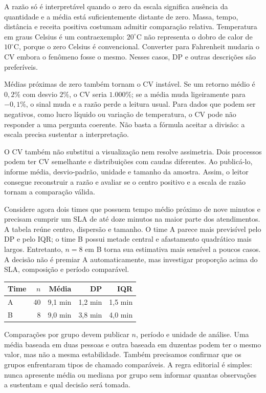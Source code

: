 A razão só é interpretável quando o zero da escala significa ausência da quantidade e a média está suficientemente distante de zero. Massa, tempo, distância e receita positiva costumam admitir comparação relativa. Temperatura em graus Celsius é um contraexemplo: $20^\circ$C não representa o dobro de calor de $10^\circ$C, porque o zero Celsius é convencional. Converter para Fahrenheit mudaria o CV embora o fenômeno fosse o mesmo. Nesses casos, DP e outras descrições são preferíveis.

Médias próximas de zero também tornam o CV instável. Se um retorno médio é $0{,}2\%$ com desvio $2\%$, o CV seria $1.000\%$; se a média muda ligeiramente para $-0{,}1\%$, o sinal muda e a razão perde a leitura usual. Para dados que podem ser negativos, como lucro líquido ou variação de temperatura, o CV pode não responder a uma pergunta coerente. Não basta a fórmula aceitar a divisão: a escala precisa sustentar a interpretação.

O CV também não substitui a visualização nem resolve assimetria. Dois processos podem ter CV semelhante e distribuições com caudas diferentes. Ao publicá-lo, informe média, desvio-padrão, unidade e tamanho da amostra. Assim, o leitor consegue reconstruir a razão e avaliar se o centro positivo e a escala de razão tornam a comparação válida.

Considere agora dois times que possuem tempo médio próximo de nove minutos e precisam cumprir um SLA de até doze minutos na maior parte dos atendimentos. A tabela reúne centro, dispersão e tamanho. O time A parece mais previsível pelo DP e pelo IQR; o time B possui metade central e afastamento quadrático mais largos. Entretanto, $n=8$ em B torna sua estimativa mais sensível a poucos casos. A decisão não é premiar A automaticamente, mas investigar proporção acima do SLA, composição e período comparável.

\begin{center}
\small
\begin{tabular}{@{}lrrrr@{}}
\toprule
\textbf{Time} & $n$ & \textbf{Média} & \textbf{DP} & \textbf{IQR} \\
\midrule
A & 40 & 9,1 min & 1,2 min & 1,5 min \\
B & 8 & 9,0 min & 3,8 min & 4,0 min \\
\bottomrule
\end{tabular}
\end{center}

Comparações por grupo devem publicar $n$, período e unidade de análise. Uma média baseada em duas pessoas e outra baseada em duzentas podem ter o mesmo valor, mas não a mesma estabilidade. Também precisamos confirmar que os grupos enfrentaram tipos de chamado comparáveis. A regra editorial é simples: nunca apresente média ou mediana por grupo sem informar quantas observações a sustentam e qual decisão será tomada.


